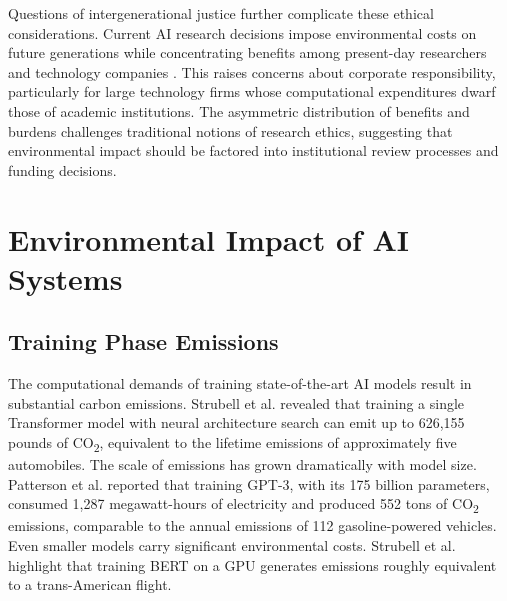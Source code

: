 \documentclass[twoside]{ai_ethics_class}
\begin{document}
Questions of intergenerational justice further complicate these ethical considerations.
Current AI research decisions impose environmental costs on future generations while concentrating benefits among present-day researchers and technology companies \cite{fairbrother2020much}.
This raises concerns about corporate responsibility, particularly for large technology firms whose computational expenditures dwarf those of academic institutions.
The asymmetric distribution of benefits and burdens challenges traditional notions of research ethics, suggesting that environmental impact should be factored into institutional review processes and funding decisions.

\section{Environmental Impact of AI Systems}


\subsection{Training Phase Emissions}
The computational demands of training state-of-the-art AI models result in substantial carbon emissions.
Strubell et al. \cite{strubell2019energy} revealed that training a single Transformer model with neural architecture search can emit up to 626,155 pounds of CO\textsubscript{2}, equivalent to the lifetime emissions of approximately five automobiles.
The scale of emissions has grown dramatically with model size.
Patterson et al. \cite{patterson2022carbon} reported that training GPT-3, with its 175 billion parameters, consumed 1,287 megawatt-hours of electricity and produced 552 tons of CO\textsubscript{2} emissions, comparable to the annual emissions of 112 gasoline-powered vehicles.
Even smaller models carry significant environmental costs.
Strubell et al. \cite{strubell2019energy} highlight that training BERT on a GPU generates emissions roughly equivalent to a trans-American flight.
\end{document}
